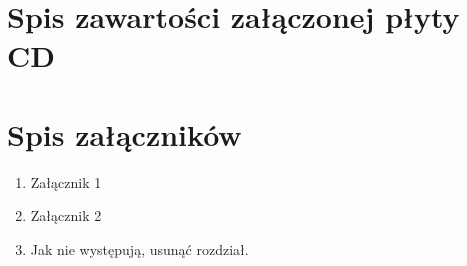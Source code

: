 \documentclass[a4paper,11pt,twoside]{report}
\theoremstyle{definition}
\begin{document}
\chapter*{Spis zawartości załączonej płyty CD}



\chapter*{Spis załączników}
\begin{enumerate}
\item Załącznik 1
\item Załącznik 2
\item Jak nie występują, usunąć rozdział.
\end{enumerate}
\end{document}
